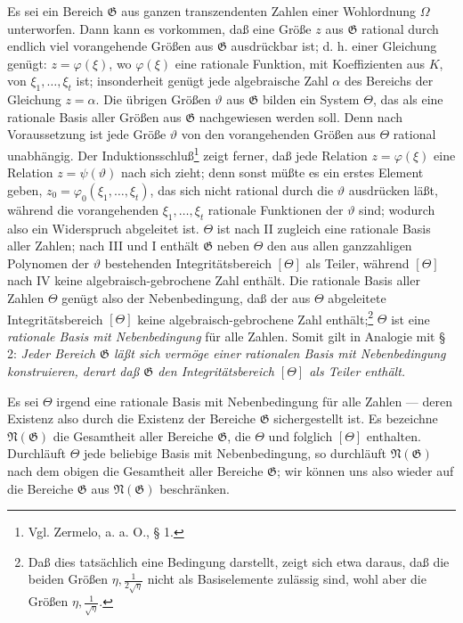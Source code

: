\documentclass[11pt]{article}
\begin{document}
Es sei ein Bereich $\mathfrak G$ aus ganzen transzendenten Zahlen einer
Wohlordnung $\Omega$ unterworfen. Dann kann es vorkommen, daß eine Größe $z$
aus $\mathfrak G$ rational durch endlich viel vorangehende Größen aus
$\mathfrak G$ ausdrückbar ist; d. h. einer Gleichung genügt:
$z=\varphi(\xi)$, wo $\varphi(\xi)$ eine rationale Funktion, mit Koeffizienten
aus $K$, von $\xi_1,\ldots,\xi_t$ ist; insonderheit genügt jede algebraische
Zahl $\alpha$ des Bereichs der Gleichung $z=\alpha$. Die übrigen Größen
$\vartheta$ aus $\mathfrak G$ bilden ein System $\Theta$, das als eine rationale
Basis aller Größen aus $\mathfrak G$ nachgewiesen werden soll. Denn nach
Voraussetzung ist jede Größe $\vartheta$ von den vorangehenden Größen aus
$\Theta$ rational unabhängig. Der Induktionsschluß\footnote{Vgl. Zermelo, a.
a. O., § 1.} zeigt ferner, daß jede Relation $z=\varphi(\xi)$ eine Relation
$z=\psi(\vartheta)$ nach sich zieht; denn sonst müßte es ein erstes Element
geben, $z_0=\varphi_0(\xi_1,\ldots,\xi_t)$, das sich nicht rational durch die
$\vartheta$ ausdrücken läßt, während die vorangehenden
$\xi_1,\ldots,\xi_t$ rationale Funktionen der $\vartheta$ sind; wodurch also ein
Widerspruch abgeleitet ist. $\Theta$ ist nach II zugleich eine rationale Basis
aller Zahlen; nach III und I enthält $\mathfrak G$ neben $\Theta$ den aus allen
ganzzahligen Polynomen der $\vartheta$ bestehenden Integritätsbereich $[\Theta]$
als Teiler, während $[\Theta]$ nach IV keine algebraisch-gebrochene Zahl
enthält. Die rationale Basis aller Zahlen $\Theta$ genügt also der
Nebenbedingung, daß der aus $\Theta$ abgeleitete Integritätsbereich $[\Theta]$
keine algebraisch-gebrochene Zahl enthält;\footnote{Daß dies tatsächlich eine
Bedingung darstellt, zeigt sich etwa daraus, daß die beiden Größen
$\eta,\frac1{2\sqrt{\eta}}$ nicht als Basiselemente zulässig sind, wohl aber die
Größen $\eta,\frac1{\sqrt{\eta}}$.} $\Theta$ ist eine \emph{rationale Basis mit
Nebenbedingung} für alle Zahlen. Somit gilt in Analogie mit § 2: \emph{Jeder
Bereich $\mathfrak G$ läßt sich vermöge einer rationalen Basis mit
Nebenbedingung konstruieren, derart daß $\mathfrak G$ den Integritätsbereich
$[\Theta]$ als Teiler enthält.}

Es sei $\Theta$ irgend eine rationale Basis mit Nebenbedingung für alle Zahlen
--- deren Existenz also durch die Existenz der Bereiche $\mathfrak G$
sichergestellt ist. Es bezeichne $\mathfrak N(\mathfrak G)$ die Gesamtheit aller
Bereiche $\mathfrak G$, die $\Theta$ und folglich $[\Theta]$ enthalten.
Durchläuft $\Theta$ jede beliebige Basis mit Nebenbedingung, so durchläuft
$\mathfrak N(\mathfrak G)$ nach dem obigen die Gesamtheit aller Bereiche
$\mathfrak G$; wir können uns also wieder auf die Bereiche $\mathfrak G$ aus
$\mathfrak N(\mathfrak G)$ beschränken.
\end{document}
